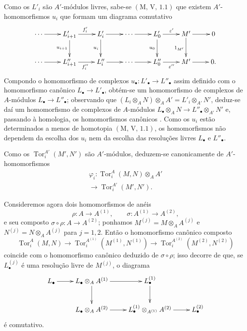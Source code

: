 
Como os $L'_i$ são $A'$-módulos livres, sabe-se $(\mathrm M,\,\mathrm V,\,1.1)$ que existem $A'$-homomorfismos $u_i$ que formam um diagrama comutativo
\[
\xymatrix{
\cdots\ar[r]&L'_{i+1}\ar[r]^{f'_i}\ar[d]_{u_{i+1}}&
L'_i\ar[r]\ar[d]_{u_i}&\cdots\ar[r]&
L'_0\ar[r]^{\varepsilon'}\ar[d]_{u_0}&M'\ar[r]\ar[d]_{1_{M'}}&0\\
\cdots\ar[r]&L''_{i+1}\ar[r]_{f''_i}&L''_i\ar[r]&\cdots\ar[r]&
L''_0\ar[r]_{\varepsilon''}&M'\ar[r]&0.
}
\]
Compondo o homomorfismo de complexos $u_\bullet:L'_\bullet\to L''_\bullet$ assim definido com o homomorfismo canônico $L_\bullet\to L'_\bullet$, obtém-se um homomorfismo de complexos de $A$-módulos $L_\bullet\to L''_\bullet$; observando que $(L_i\otimes_AN)\otimes_AA'=L'_i\otimes_{A'}N'$, deduz-se daí um homomorfismo de complexos de $A$-módulos $L_\bullet\otimes_AN\to L''_\bullet\otimes_{A'}N'$ e, passando à homologia, os homomorfismos canônicos . Como os $u_i$ estão determinados a menos de homotopia $(\mathrm M,\,\mathrm V,\,1.1)$, os homomorfismos  não dependem da escolha dos $u_i$ nem da escolha das resoluções livres $L_\bullet$ e $L''_\bullet$.

\begin{sloppypar}
Como os $\operatorname{Tor}_i^{A'}(M',N')$ são $A'$-módulos, deduzem-se canonicamente de  $A'$-homomorfismos
\begin{equation}
\begin{gathered}
\varphi_i:\operatorname{Tor}_i^A(M,N)\otimes_AA'\\[-2pt]
\longrightarrow\operatorname{Tor}_i^{A'}(M',N').
\end{gathered}
\label{IV.11.2.1.5}
\tag{11.2.1.5}
\end{equation}
\end{sloppypar}

Consideremos agora dois homomorfismos de anéis
\[
\rho:A\to A^{(1)},\qquad \sigma:A^{(1)}\to A^{(2)},
\]
e seu composto $\sigma\circ\rho:A\to A^{(2)}$; ponhamos $M^{(j)}=M\otimes_AA^{(j)}$ e $N^{(j)}=N\otimes_AA^{(j)}$ para $j=1,2$. Então o homomorfismo canônico composto
\[
\operatorname{Tor}_i^A(M,N)\to
\operatorname{Tor}_i^{A^{(1)}}(M^{(1)},N^{(1)})\to
\operatorname{Tor}_i^{A^{(2)}}(M^{(2)},N^{(2)})
\]
coincide com o homomorfismo canônico deduzido de $\sigma\circ\rho$; isso decorre de que, se $L_\bullet^{(j)}$ é uma resolução livre de $M^{(j)}$, o diagrama
\[
\xymatrix{
L_\bullet\ar[r]&L_\bullet\otimes_AA^{(1)}\ar[r]\ar[d]&
L_\bullet^{(1)}\ar[d]\\
&L_\bullet\otimes_AA^{(2)}\ar[r]&
L_\bullet^{(1)}\otimes_{A^{(1)}}A^{(2)}\ar[r]&L_\bullet^{(2)}
}
\]
é comutativo.

